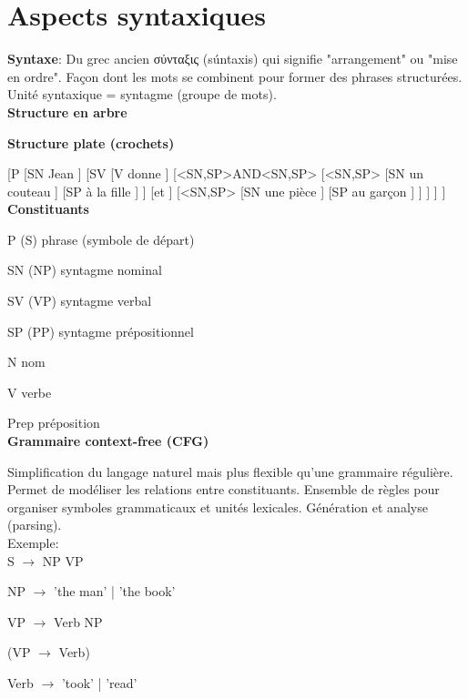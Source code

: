 \vspace{-1.2cm}

\section{Aspects syntaxiques}

\textbf{Syntaxe}: Du grec ancien \textgreek{σύνταξις} (súntaxis) qui signifie "arrangement" ou "mise en ordre". Façon dont les mots se combinent pour former des phrases structurées. Unité syntaxique = syntagme (groupe de mots).\\

\textbf{Structure en arbre}

\begin{center}
\resizebox{0.6\textwidth}{!}{
    
}
\end{center}

\textbf{Structure plate (crochets)}

[P [SN Jean ] [SV [V donne ] [<SN,SP>AND<SN,SP> [<SN,SP> [SN un couteau ] [SP à la fille ] ] [et ] [<SN,SP> [SN une pièce ] [SP au garçon ] ] ] ] ] \\

\textbf{Constituants}

P (S) phrase (symbole de départ)

SN (NP) syntagme nominal

SV (VP) syntagme verbal

SP (PP) syntagme prépositionnel

N nom

V verbe

Prep préposition\\

\textbf{Grammaire context-free (CFG)}

Simplification du langage naturel mais plus flexible qu'une grammaire régulière. Permet de modéliser les relations entre constituants. Ensemble de règles pour organiser symboles grammaticaux et unités lexicales. Génération et analyse (parsing).\\

Exemple: \\

S $\rightarrow$ NP VP

NP $\rightarrow$ 'the man' | 'the book'

VP $\rightarrow$ Verb NP

(VP $\rightarrow$ Verb)

Verb $\rightarrow$ 'took' | 'read' \\


